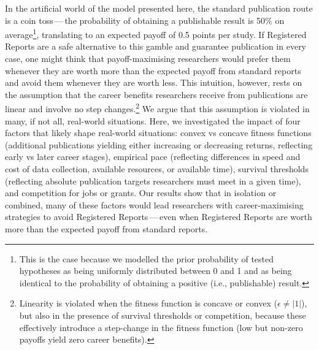 \documentclass[
  ,man,mask,floatsintext]{apa6}
\begin{document}
In the artificial world of the model presented here, the standard publication route is a coin toss\(\,\)---\(\,\)the probability of obtaining a publishable result is 50\% on average\footnote{This is the case because we modelled the prior probability of tested hypotheses as being uniformly distributed between 0 and 1 and as being identical to the probability of obtaining a positive (i.e., publishable) result.}, translating to an expected payoff of 0.5 points per study.
If Registered Reports are a safe alternative to this gamble and guarantee publication in every case, one might think that payoff-maximising researchers would prefer them whenever they are worth more than
the expected payoff from standard reports and avoid them whenever they are worth less.
This intuition, however, rests on the assumption
that the career benefits researchers receive from publications are linear and involve no step changes.\footnote{Linearity is violated when the fitness function is concave or convex (\(\epsilon \neq |1|\)), but also in the presence of survival thresholds or competition, because these effectively introduce a step-change in the fitness function (low but non-zero payoffs yield zero career benefits).}
We argue that this assumption is violated in many, if not all, real-world situations.
Here, we investigated the impact of four factors that likely shape real-world situations:
convex vs concave fitness functions (additional publications yielding either increasing or decreasing returns, reflecting early vs later career stages), empirical pace (reflecting differences in speed and cost of data collection, available resources, or available time), survival thresholds (reflecting absolute publication targets researchers must meet in a given time), and competition for jobs or grants.
Our results show that in isolation or combined, many of these factors
would lead researchers with career-maximising strategies to avoid Registered Reports\(\,\)---\(\,\)even when Registered Reports are worth more than the expected payoff from standard reports.
\end{document}
